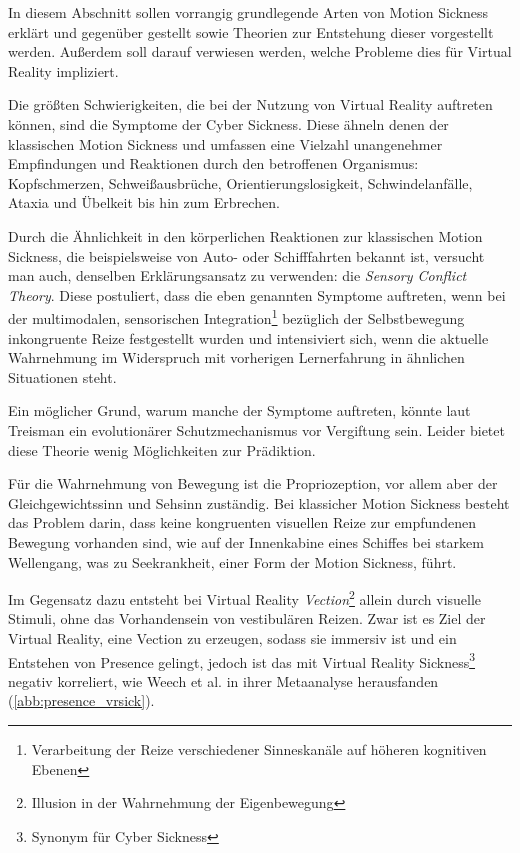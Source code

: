 In diesem Abschnitt sollen vorrangig grundlegende Arten von Motion Sickness erkl\"art und gegen\"uber gestellt sowie Theorien zur Entstehung dieser vorgestellt werden. Au{\ss}erdem soll darauf verwiesen werden, welche Probleme dies f\"ur Virtual Reality impliziert.

Die gr\"o{\ss}ten Schwierigkeiten, die bei der Nutzung von Virtual Reality auftreten k\"onnen, sind die Symptome der Cyber Sickness. Diese \"ahneln denen der klassischen Motion Sickness und umfassen eine Vielzahl unangenehmer Empfindungen und Reaktionen durch den betroffenen Organismus: Kopfschmerzen, Schwei{\ss}ausbr\"uche, Orientierungslosigkeit, Schwindelanf\"alle, Ataxia und \"Ubelkeit bis hin zum Erbrechen\cite{LaViola:2000:CSinVR, Kolasinski:1998:SympCS}.

Durch die \"Ahnlichkeit in den k\"orperlichen Reaktionen zur klassischen Motion Sickness, die beispielsweise von Auto- oder Schifffahrten bekannt ist, versucht man auch, denselben Erkl\"arungsansatz zu verwenden: die \textit{Sensory Conflict Theory}\cite{Kolasinski:1998:SympCS,Johnson:2005:SCT_Expl}.
Diese postuliert, dass die eben genannten Symptome auftreten, wenn bei der multimodalen, sensorischen Integration\footnote{ Verarbeitung der Reize verschiedener Sinneskan\"ale auf h\"oheren kognitiven Ebenen} bez\"uglich der Selbstbewegung inkongruente Reize festgestellt wurden und intensiviert sich, wenn die aktuelle Wahrnehmung im Widerspruch mit vorherigen Lernerfahrung in \"ahnlichen Situationen steht\cite{Reason:1975:MSexp}.

Ein m\"oglicher Grund, warum manche der Symptome auftreten, k\"onnte laut Treisman\cite{Treisman:1977:Toxic} ein evolution\"arer Schutzmechanismus vor Vergiftung sein. Leider bietet diese Theorie wenig M\"oglichkeiten zur Pr\"adiktion.

F\"ur die Wahrnehmung von Bewegung ist die Propriozeption, vor allem aber der Gleichgewichtssinn und Sehsinn zust\"andig.
Bei klassicher Motion Sickness besteht das Problem darin, dass keine kongruenten visuellen Reize zur empfundenen Bewegung vorhanden sind, wie auf der Innenkabine eines Schiffes bei starkem Wellengang, was zu Seekrankheit, einer Form der Motion Sickness, f\"uhrt.

Im Gegensatz dazu entsteht bei Virtual Reality \textit{Vection}\footnote{ Illusion in der Wahrnehmung der Eigenbewegung} allein durch visuelle Stimuli, ohne das Vorhandensein von vestibul\"aren Reizen.
Zwar ist es Ziel der Virtual Reality, eine Vection zu erzeugen, sodass sie immersiv ist und ein Entstehen von Presence gelingt, jedoch ist das mit Virtual Reality Sickness\footnote{Synonym f\"ur Cyber Sickness} negativ korreliert, wie Weech et al.\cite{Weech:2019:PresenceCS} in ihrer Metaanalyse herausfanden (\autoref{abb:presence_vrsick}).

